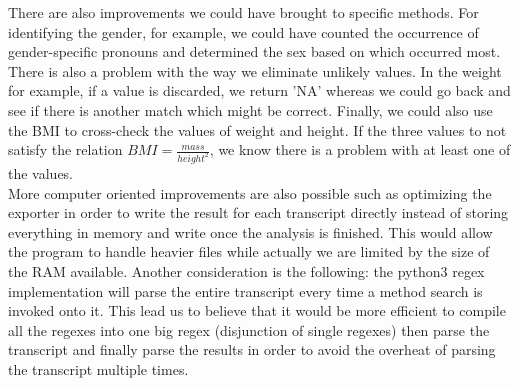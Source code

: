 \documentclass[10pt, a4paper, oneside]{article} %
\begin{document}
There are also improvements we could have brought to specific methods. For identifying the gender, for example, we could have counted the occurrence of gender-specific pronouns and determined the sex based on which occurred most. There is also a problem with the way we eliminate unlikely values. In the weight for example, if a value is discarded, we return 'NA' whereas we could go back and see if there is another match which might be correct. Finally, we could also use the BMI to cross-check the values of weight and height. If the three values to not satisfy the relation $ BMI = \frac{mass}{height^2} $, we know there is a problem with at least one of the values.\\

More computer oriented improvements are also possible such as optimizing the exporter in order to write the result for each transcript directly instead of storing everything in memory and write once the analysis is finished. This would allow the program to handle heavier files while actually we are limited by the size of the RAM available. Another consideration is the following: the python3 regex implementation will parse the entire transcript every time a method search is invoked onto it. This lead us to believe that it would be more efficient to compile all the regexes into one big regex (disjunction of single regexes) then parse the transcript and finally parse the results in order to avoid the overheat of parsing the transcript multiple times.

\pagestyle{fancy} %

\pagebreak
%
%
%
%
%
%
%
%
%
%
%
%
%
%




%
%
%
\end{document}
